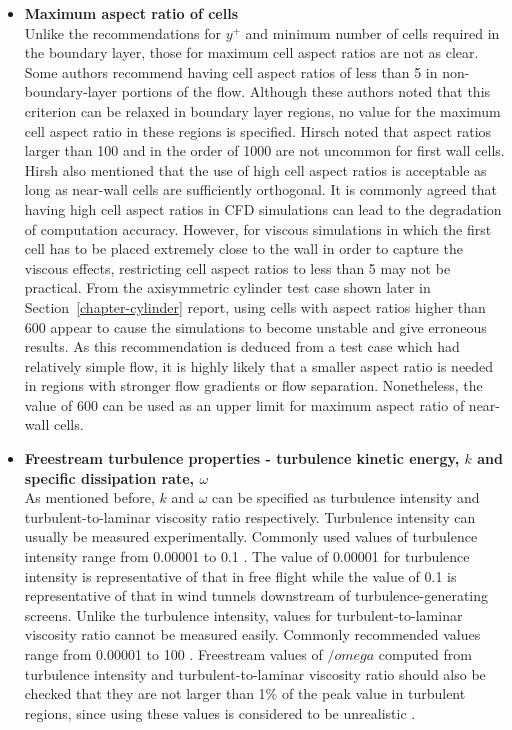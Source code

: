 \begin{itemize}
\item \textbf{Maximum aspect ratio of cells} \\
Unlike the recommendations for $y^+$ and minimum number of cells required in the
boundary layer, those for maximum cell aspect ratios are not as clear. Some authors
\cite{Tu2008,Fluent2006} recommend having cell aspect ratios of less than 5 in
non-boundary-layer portions of the flow. Although these authors noted that this criterion can
be relaxed in boundary layer regions, no value for the maximum cell aspect ratio in these regions is specified.
Hirsch \cite{Hirsch1988,Hirsch2007} noted that aspect ratios larger than 100 and in the order of
1000 are not uncommon for first wall cells. Hirsh also mentioned that the use of high cell aspect
ratios is acceptable as long as near-wall cells are sufficiently orthogonal. 
It is commonly agreed that having high cell aspect ratios in CFD simulations can lead to the
degradation of computation accuracy. However, for viscous simulations in which the first cell
has to be placed extremely close to the wall in order to capture the viscous effects,
restricting cell aspect ratios to less than 5 may not be practical. From the axisymmetric
cylinder test case shown later in Section~\ref{chapter-cylinder} report, using cells with 
aspect ratios higher than 600 appear to cause the simulations to become unstable and give 
erroneous results. As this recommendation is deduced from a test case which had relatively 
simple flow, it is highly likely that a smaller aspect ratio is needed in regions with 
stronger flow gradients or flow separation. Nonetheless, the value of 600 can be used as 
an upper limit for maximum aspect ratio of near-wall cells.

\item \textbf{Freestream turbulence properties - turbulence kinetic energy, $k$ 
and specific dissipation rate, $\omega$} \\
As mentioned before, $k$ and $\omega$ can be specified as turbulence intensity
and turbulent-to-laminar viscosity ratio respectively. 
Turbulence intensity can usually be measured experimentally. Commonly used values of 
turbulence intensity range from 0.00001 to 0.1 \cite{Roy2003,Fluent2006}. The value of 
0.00001 for turbulence intensity is representative of that in free flight while the value 
of 0.1 is representative of that in wind tunnels downstream of turbulence-generating screens.
Unlike the turbulence intensity, values for turbulent-to-laminar viscosity ratio cannot
be measured easily. Commonly recommended values range from 0.00001 to 100 \cite{Roy2003,Fluent2006,
ESI2004,Tu2008}. Freestream values of $/omega$ computed from turbulence intensity and
turbulent-to-laminar viscosity ratio should also be checked that they are not larger
than 1\% of the peak value in turbulent regions, since using these values is considered
to be unrealistic \cite{Wilcox2006}.

\end{itemize}

